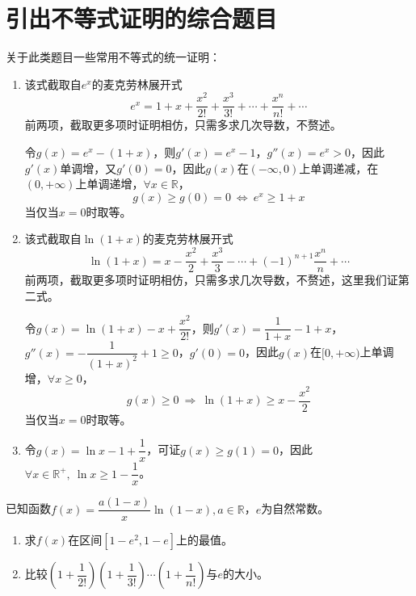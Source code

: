 \section{引出不等式证明的综合题目}
关于此类题目一些常用不等式的统一证明：
\begin{enumerate}
	\item {} \par
	该式截取自$e^x$的麦克劳林展开式$$e^x=1+x+\dfrac{x^2}{2!}+\dfrac{x^3}{3!}+\cdots+\dfrac{x^n}{n!}+\cdots$$前两项，截取更多项时证明相仿，只需多求几次导数，不赘述。\par
	令$g(x)=e^x-(1+x)$，则$g'(x)=e^x-1$，$g''(x)=e^x>0$，因此$g'(x)$单调增，又$g'(0)=0$，因此$g(x)$在$(-\infty,0)$上单调递减，在$(0,+\infty)$上单调递增，$\forall x\in\mathbb{R}$，$$g(x)\geqslant g(0)=0\ \Leftrightarrow\ e^x\geqslant 1+x$$
	当仅当$x=0$时取等。
	 \item {} \par
	该式截取自$\ln(1+x)$的麦克劳林展开式$$\ln(1+x)=x-\dfrac{x^2}{2}+\dfrac{x^3}{3}-\cdots+(-1)^{n+1}\dfrac{x^n}{n}+\cdots$$前两项，截取更多项时证明相仿，只需多求几次导数，不赘述，这里我们证第二式。\par
	令$g(x)=\ln(1+x)-x+\dfrac{x^2}{2!}$，则$g'(x)=\dfrac{1}{1+x}-1+x$，$g''(x)=-\dfrac{1}{(1+x)^2}+1\geqslant 0$，$g'(0)=0$，因此$g(x)$在$[0,+\infty)$上单调增，$\forall x\geqslant 0$，$$g(x)\geqslant 0 \ \Rightarrow\ \ln(1+x)\geqslant x-\dfrac{x^2}{2}$$
	当仅当$x=0$时取等。
	\item {} \par
	令$g(x)=\ln x-1+\dfrac{1}{x}$，可证$g(x)\geqslant g(1)=0$，因此$\forall x\in \mathbb{R}^+,\ \ln x\geqslant 1-\dfrac{1}{x}$。
\end{enumerate}
\begin{que}
	已知函数$f(x)=\dfrac{a(1-x)}{x}\ln(1-x),a\in\mathbb{R}$，$e$为自然常数。
	\begin{enumerate}
		\item 求$f(x)$在区间$\left[1-e^2,1-e\right]$上的最值。
		\item 比较$\left(1+\dfrac{1}{2!}\right)\left(1+\dfrac{1}{3!}\right)\cdots\left(1+\dfrac{1}{n!}\right)$与$e$的大小。
	\end{enumerate}
\end{que}
